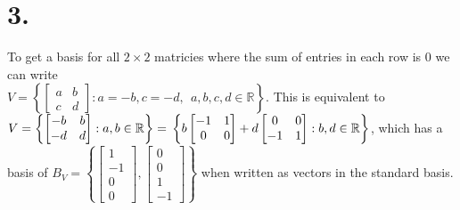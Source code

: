 \documentclass{article}
\begin{document}
\section*{3.}
	To get a basis for all $2\times2$ matricies where the sum of entries in each row is 0 we can write\\ $V= \left\{\begin{bmatrix}a&b\\c&d\end{bmatrix}:a=-b,c=-d, \ \ a,b,c,d \in \mathbb{R}\right\}$.
	This is equivalent to $V= \left\{\begin{bmatrix}-b&b\\-d&d\end{bmatrix}:a,b \in \mathbb{R}\right\} =\\ \left\{b\begin{bmatrix}-1&1\\0&0\end{bmatrix} + d\begin{bmatrix}0&0\\-1&1\end{bmatrix}: b,d \in \mathbb{R}\right\}$, which has a basis of $B_V = \left\{\begin{bmatrix}1\\-1\\0\\0\end{bmatrix}, \begin{bmatrix}0\\0\\1\\-1\end{bmatrix}\right\}$ when written as vectors in the standard basis.
\end{document}
